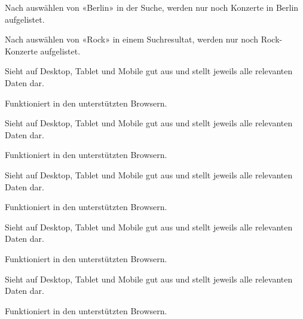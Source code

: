 {Nach auswählen von «Berlin» in der Suche, werden nur noch Konzerte in Berlin aufgelistet.}

{Nach auswählen von «Rock» in einem Suchresultat, werden nur noch Rock-Konzerte aufgelistet.}

\clearpage

{Sieht auf Desktop, Tablet und Mobile gut aus und stellt jeweils alle relevanten Daten dar.}

{Funktioniert in den unterstützten Browsern.}

\clearpage

{Sieht auf Desktop, Tablet und Mobile gut aus und stellt jeweils alle relevanten Daten dar.}

{Funktioniert in den unterstützten Browsern.}

\clearpage

{Sieht auf Desktop, Tablet und Mobile gut aus und stellt jeweils alle relevanten Daten dar.}

{Funktioniert in den unterstützten Browsern.}

\clearpage

{Sieht auf Desktop, Tablet und Mobile gut aus und stellt jeweils alle relevanten Daten dar.}

{Funktioniert in den unterstützten Browsern.}

\clearpage

{Sieht auf Desktop, Tablet und Mobile gut aus und stellt jeweils alle relevanten Daten dar.}

{Funktioniert in den unterstützten Browsern.}


